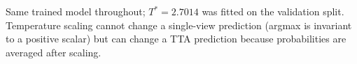 Same trained model throughout; $T^{*}=2.7014$ was fitted on the validation split. Temperature scaling cannot change a single-view prediction (argmax is invariant to a positive scalar) but can change a TTA prediction because probabilities are averaged after scaling.
